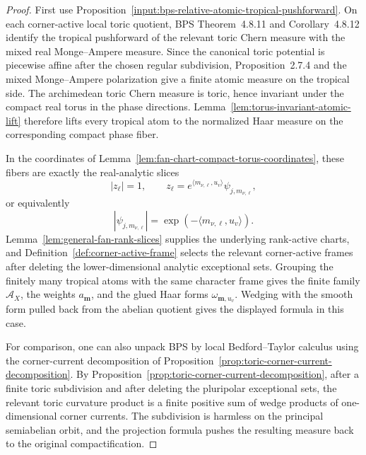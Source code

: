 \documentclass[10pt,a4paper]{amsart}
\theoremstyle{plain}
\theoremstyle{plain}
\numberwithin{equation}{section}
\begin{document}
\begin{proof}
	First use Proposition~\ref{input:bps-relative-atomic-tropical-pushforward}.  On
	each corner-active local toric quotient, BPS Theorem~4.8.11 and
	Corollary~4.8.12 identify the tropical pushforward of the relevant toric Chern
	measure with the mixed real Monge--Ampere measure.  Since the canonical toric
	potential is piecewise affine after the chosen regular subdivision,
	Proposition~2.7.4 and the mixed Monge--Ampere polarization give a finite
	atomic measure on the tropical side.  The archimedean toric Chern measure is
	toric, hence invariant under the compact real torus in the phase directions.
	Lemma~\ref{lem:torus-invariant-atomic-lift} therefore lifts every tropical atom
	to the normalized Haar measure on the corresponding compact phase fiber.
	
	In the coordinates of Lemma~\ref{lem:fan-chart-compact-torus-coordinates},
	these fibers are exactly the real-analytic slices
	\[
	|z_\ell|=1,\qquad
	z_\ell=e^{\langle m_{\nu,\ell},u_v\rangle}
	\psi_{j,m_{\nu,\ell}},
	\]
	or equivalently
	\[
	|\psi_{j,m_{\nu,\ell}}|
	=\exp(-\langle m_{\nu,\ell},u_v\rangle).
	\]
	Lemma~\ref{lem:general-fan-rank-slices} supplies the underlying rank-active
	charts, and Definition~\ref{def:corner-active-frame} selects the relevant
	corner-active frames after deleting the lower-dimensional analytic exceptional
	sets.  Grouping the finitely many
	tropical atoms with the same character frame gives the finite family
	\(\mathcal A_X\), the weights \(a_{\mathbf m}\), and the glued Haar forms
	\(\omega_{\mathbf m,u_v}\).  Wedging with the smooth form pulled back from the
	abelian quotient gives the displayed formula in this case.
	
	For comparison, one can also unpack BPS by local Bedford--Taylor calculus
	using the corner-current decomposition of
	Proposition~\ref{prop:toric-corner-current-decomposition}.
	By Proposition~\ref{prop:toric-corner-current-decomposition}, after a finite toric
	subdivision and after deleting the pluripolar exceptional sets, the relevant
	toric curvature product is a finite positive sum of wedge products of
	one-dimensional corner currents.  The subdivision is harmless on the principal
	semiabelian orbit, and the projection formula pushes the resulting measure
	back to the original compactification.
	

\end{proof}
\end{document}
